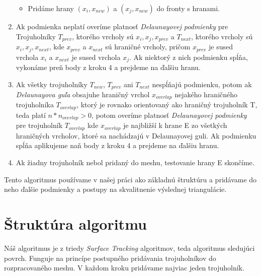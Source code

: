 \begin{enumerate}
{\begin{itemize}
        \item{Pridáme hrany $(x_i, x_{new})$ a 
        $(x_j, x_{new})$ do fronty s hranami.}
    \end{itemize}
    }
    \item{
        Ak podmienka neplatí overíme platnosť \textit{Delaunayovej podmienky} pre Trojuholníky 
        $T_{prev}$, ktorého vrcholy sú $x_i, x_j, 
        x_{prev}$ a $T_{next}$, ktorého vrcholy sú 
        $x_i, x_j, x_{next}$, kde 
        $x_{prev}$ a $x_{next}$ sú hraničné vrcholy,
        pričom $x_{prev}$ 
        je sused vrchola $x_i$ a $x_{next}$ je sused vrchola 
        $x_j$. Ak niektorý z nich podmienku
        spĺňa, vykonáme preň body z kroku 4 a prejdeme na ďalšiu hranu.
    }
    \item{
        Ak všetky trojuholníky $T_{new}$, $T_{prev}$ ani $T_{next}$ nespĺňajú podmienku, potom 
        ak \textit{Delaunayova guľa} obsajuhe hraničný vrchol $x_{overlap}$ nejakého hraničného 
        trojuholníka $T_{overlap}$, ktorý je rovnako orientovaný ako hraničný trojuholník T, teda
        platí $n*n_{overlap} > 0$, potom overíme platnosť \textit{Delaunayovej podmienky} pre 
        trojuholník $T_{overlap}$ kde $x_{overlap}$ je najbližší k hrane E zo všetkých hraničných
        vrcholov, ktoré sa nachádzajú v Delaunayovej guli. Ak podmienku spĺňa aplikujeme naň body z 
        kroku 4 a prejdeme na ďalšiu hranu.
    }
    \item{
        Ak žiadny trojuholník nebol pridaný do meshu, testovanie hrany E skončíme.
    }
\end{enumerate}

Tento algoritmus používame v našej práci ako základnú štruktúru a pridávame do neho ďalšie podmienky 
a postupy na skvalitnenie výslednej triangulácie. 

\section {Štruktúra algoritmu}

Náš algoritmus je z triedy \textit{Surface Tracking} algoritmov, teda algoritmus sledujúci povrch.
Funguje na princípe postupného pridávania trojuholníkov do rozpracovaného meshu. V každom kroku
pridávame najviac jeden trojuholník.

